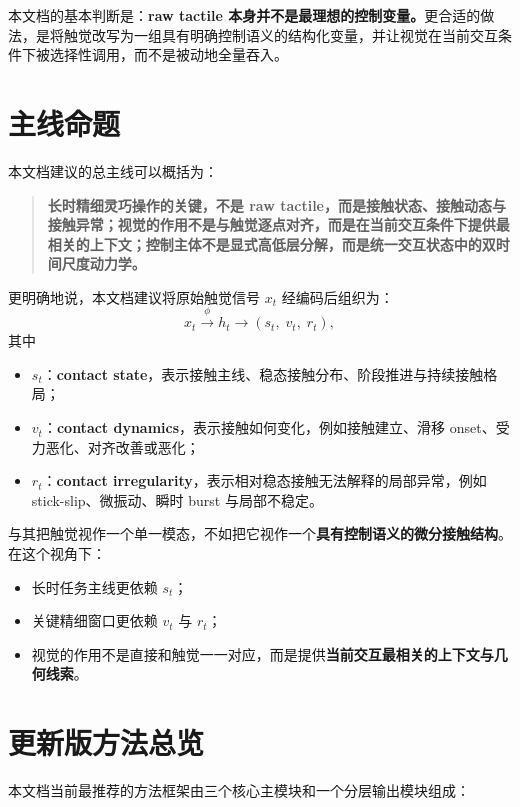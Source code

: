 \documentclass[11pt]{article}
\begin{document}
本文档的基本判断是：\textbf{raw tactile 本身并不是最理想的控制变量。}更合适的做法，是将触觉改写为一组具有明确控制语义的结构化变量，并让视觉在当前交互条件下被选择性调用，而不是被动地全量吞入。

\section{主线命题}

本文档建议的总主线可以概括为：

\begin{quote}
\textbf{长时精细灵巧操作的关键，不是 raw tactile，而是接触状态、接触动态与接触异常；视觉的作用不是与触觉逐点对齐，而是在当前交互条件下提供最相关的上下文；控制主体不是显式高低层分解，而是统一交互状态中的双时间尺度动力学。}
\end{quote}

更明确地说，本文档建议将原始触觉信号 $x_t$ 经编码后组织为：
\[
x_t \xrightarrow{\phi} h_t \rightarrow (s_t,\; v_t,\; r_t),
\]
其中
\begin{itemize}[leftmargin=2em]
    \item $s_t$：\textbf{contact state}，表示接触主线、稳态接触分布、阶段推进与持续接触格局；
    \item $v_t$：\textbf{contact dynamics}，表示接触如何变化，例如接触建立、滑移 onset、受力恶化、对齐改善或恶化；
    \item $r_t$：\textbf{contact irregularity}，表示相对稳态接触无法解释的局部异常，例如 stick-slip、微振动、瞬时 burst 与局部不稳定。
\end{itemize}

与其把触觉视作一个单一模态，不如把它视作一个\textbf{具有控制语义的微分接触结构}。在这个视角下：
\begin{itemize}[leftmargin=2em]
    \item 长时任务主线更依赖 $s_t$；
    \item 关键精细窗口更依赖 $v_t$ 与 $r_t$；
    \item 视觉的作用不是直接和触觉一一对应，而是提供\textbf{当前交互最相关的上下文与几何线索}。
\end{itemize}

\section{更新版方法总览}

本文档当前最推荐的方法框架由三个核心主模块和一个分层输出模块组成：
\end{document}
